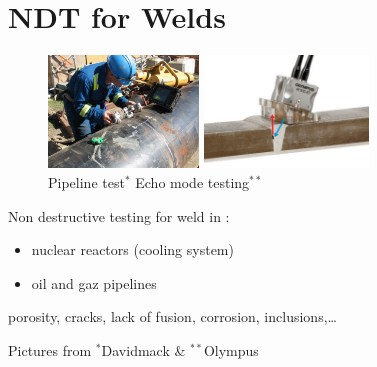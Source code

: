 \documentclass[11pt,xcolor=x11names,compress, notes=show]{beamer}%
\begin{document}
\section*{NDT for Welds}
\begin{frame}{\insertsectionhead}
\vspace{-0.7cm}
	\begin{figure}
		\centering
		\includegraphics[height=3cm]{img/us_test.jpg}
		\hspace{1cm}
		\includegraphics[height=3cm]{img/olympus.jpg}\\
		{\tiny Pipeline test$^{*}$\hspace{4cm} Echo mode testing$^{**}$}
	\end{figure}

			Non destructive testing for weld in :\\
			\begin{itemize}
				\item nuclear reactors (cooling system)
				\item oil and gaz pipelines
			\end{itemize}
			\vspace{0.6cm}
 			\indent {} porosity, cracks, lack of fusion, corrosion, inclusions,\ldots


	
\vfill
{\tiny Pictures from $^{*}$Davidmack \& $^{**}$Olympus}\vspace{-0.5cm}
\end{frame}
\end{document}
